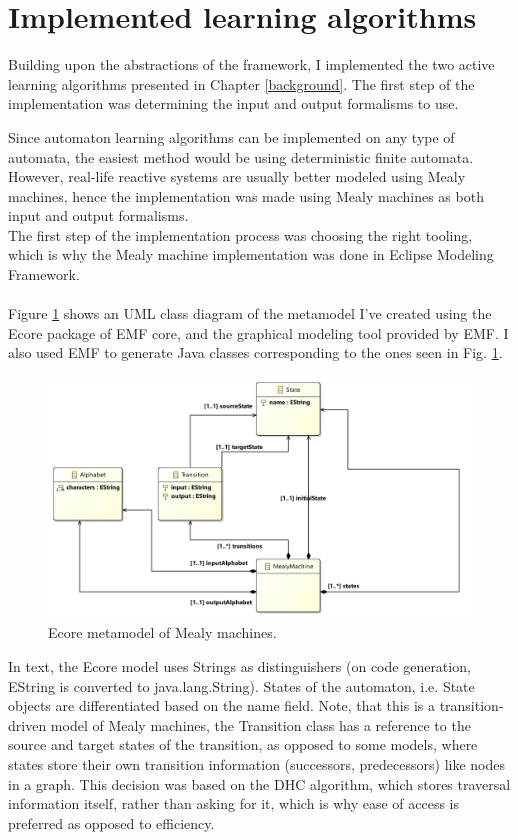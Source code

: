 \section{Implemented learning algorithms}

Building upon the abstractions of the framework, I implemented the two active learning algorithms presented in Chapter \ref{background}. The first step of the implementation was determining the input and output formalisms to use.

Since automaton learning algorithms can be implemented on any type of automata, the easiest method would be using deterministic finite automata. However, real-life reactive systems are usually better modeled using Mealy machines, hence the implementation was made using Mealy machines as both input and output formalisms.
\\
The first step of the implementation process was choosing the right tooling, which is why the Mealy machine implementation was done in Eclipse Modeling Framework.
\\\\
Figure \ref*{fig:mealyecore} shows an UML class diagram of the metamodel I've created using the Ecore package of EMF core, and the graphical modeling tool provided by EMF. I also used EMF to generate Java classes corresponding to the ones seen in Fig. \ref{fig:mealyecore}.

\begin{figure}
	\centering
	\includegraphics[width=1.0\linewidth]{figures/mealymodel}
	\caption{Ecore metamodel of Mealy machines.}
	\label{fig:mealyecore}
\end{figure}

In text, the Ecore model uses Strings as distinguishers (on code generation, EString is converted to java.lang.String). States of the automaton, i.e. State objects are differentiated based on the name field. Note, that this is a transition-driven model of Mealy machines, the Transition class has a reference to the source and target states of the transition, as opposed to some models, where states store their own transition information (successors, predecessors) like nodes in a graph. This decision was based on the DHC algorithm, which stores traversal information itself, rather than asking for it, which is why ease of access is preferred as opposed to efficiency.

